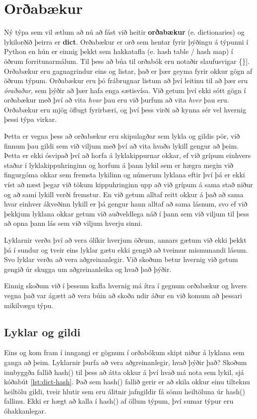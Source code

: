 
\chapter{Orðabækur}\label{k:orðabækur}
Ný týpa sem vil ætlum að nú að fást við heitir \textbf{orðabækur} (e. dictionaries)  og lykilorðið þeirra er \textbf{dict}.
Orðabækur er orð sem hentar fyrir þýðingu á týpunni í Python en hún er einnig þekkt sem hakkatafla (e. hash table / hash map) í öðrum forritunarmálum.
Til þess að búa til orðabók eru notaðir slaufusvigar \{\}].
Orðabækur eru gagnagrindur eins og listar, það er þær geyma fyrir okkur gögn af öðrum týpum.
Orðabækur eru þó frábrugnar listum að því leitinu til að þær eru \textit{óraðaðar}, sem þýðir að þær hafa enga sætisvísa.
Við getum því ekki sótt gögn í orðabækur með því að vita \textit{hvar} þau eru við þurfum að vita \textit{hver} þau eru.
Orðabækur eru mjög öflugt fyrirbæri, og því þess virði að kynna sér vel hvernig þessi týpa virkar.

Þetta er vegna þess að orðabækur eru skipulagðar sem lykla og gildis pör, við finnum þau gildi sem við viljum með því að vita hvaða lykill gengur að þeim.
Þetta er ekki ósvipað því að horfa á lyklakippurnar okkar, ef við grípum einhvers staðar í lyklakippuhringinn og horfum á þann lykil sem er hægra megin við fingurgóma okkar sem fremsta lykilinn og númerum lyklana eftir því þá er ekki víst að næst þegar við tökum kippuhringinn upp að við grípum á sama stað niður og að sami lykill verði fremstur.
En við getum alltaf reitt okkur á það að sama hvar einhver ákveðinn lykill er þá gengur hann alltaf að sama lásnum, svo ef við þekkjum lyklana okkar getum við auðveldlega náð í þann sem við viljum til þess að opna þann lás sem við viljum hverju sinni.

Lyklarnir verða því að vera ólíkir hverjum öðrum, annars gætum við ekki þekkt þá í sundur og tveir eins lyklar gætu ekki gengið að tveimur mismunandi lásum.
Svo lyklar verða að vera aðgreinanlegir.
Við skoðum betur hvernig við getum gengið úr skugga um aðgreinanleika og hvað það þýðir.

Einnig skoðum við í þessum kafla hvernig má ítra í gegnum orðabækur og hvers vegna það var ágætt að vera búin að skoða ndir áður en við komum að þessari mikilvægu týpu.

\section{Lyklar og gildi}
Eins og kom fram í inngangi er gögnum í orðabókum skipt niður á lyklana sem ganga að þeim.
Lyklarnir þurfa að vera aðgreinanlegir, hvað þýðir það?
Skoðum innbyggða fallið hash() til þess að átta okkur á því hvað má nota sem lykil, sjá kóðabút \ref{lst:dict-hash}.
Það sem hash() fallið gerir er að skila okkur einu tilteknu heiltölu gildi, tveir hlutir sem eru álitnir jafngildir fá sömu heiltöluna úr hash() fallinu.
Ekki er hægt að kalla í hash() af öllum týpum, því sumar týpur eru óhakkanlegar.


